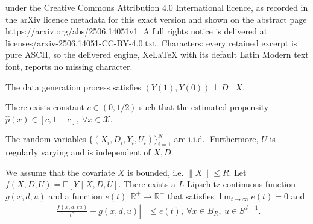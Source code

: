 \documentclass[10pt,a4paper]{amsart}
\begin{document}
under the Creative Commons Attribution 4.0 International licence, as recorded in the arXiv licence metadata for this exact version and shown on the abstract page https://arxiv.org/abs/2506.14051v1. A full rights notice is delivered at licenses/arxiv-2506.14051-CC-BY-4.0.txt. Characters: every retained excerpt is pure ASCII, so the delivered engine, XeLaTeX with its default Latin Modern text font, reports no missing character.
\begin{assumption} [Exogeneity] \label{assump:exo}
  \label{assump:unconfouding}The data generation process satisfies $(Y (1), Y(0)) \perp D \mid X$. 
\end{assumption}

\begin{assumption}
  [Overlap]\label{assump:overlap}There exists constant $c \in (0,1/2)$ such that the estimated propensity $\hat{p} (x) \in [c, 1 - c], \  \forall x \in \mathcal{X}$.
\end{assumption}

\begin{assumption}
  \label{assump:iid}
  The random variables $\{(X_i, D_i, Y_i, U_i)\}_{i = 1}^N$ are i.i.d.. Furthermore, $U$ is regularly varying and is independent of $X, D$. 
\end{assumption}

\begin{assumption}\label{assump:f_homo}
  We assume that the covariate $X$ is bounded, i.e. $\|X\| \leqslant R$. Let $f (X, D, U) =\mathbb{E}[Y \mid X, D, U]$. There exists a $L$-Lipschitz continuous function $g (x,
  d, u)$ and a function $e (t) : \mathbb{R}^+ \rightarrow \mathbb{R}^+$ that satisfies $\lim_{t \rightarrow \infty} e (t) = 0$ and
  \begin{align*}
    | \frac{f (x, d, tu)}{t^{\alpha}} - g (x, d, u) | & \leqslant e (t), \ \forall x \in B_R,\  u \in S^{d - 1}.
  \end{align*}
\end{assumption}
\end{document}

